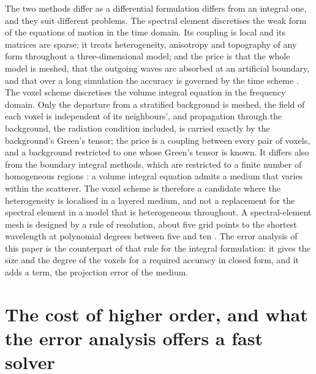 \documentclass[preprint,review,12pt]{elsarticle}
\begin{document}
The two methods differ as a differential formulation differs from an integral one, and they suit
different problems. The spectral element discretises the weak form of the equations of motion in the
time domain. Its coupling is local and its matrices are sparse; it treats heterogeneity, anisotropy
and topography of any form throughout a three-dimensional model; and the price is that the whole
model is meshed, that the outgoing waves are absorbed at an artificial boundary, and that over a long
simulation the accuracy is governed by the time scheme \citep{Komatitsch1999}. The voxel scheme
discretises the volume integral equation in the frequency domain. Only the departure from a stratified
background is meshed, the field of each voxel is independent of its neighbours', and propagation
through the background, the radiation condition included, is carried exactly by the background's
Green's tensor; the price is a coupling between every pair of voxels, and a background restricted to
one whose Green's tensor is known. It differs also from the boundary integral methods, which are
restricted to a finite number of homogeneous regions \citep{Komatitsch1999}: a volume integral
equation admits a medium that varies within the scatterer. The voxel scheme is therefore a candidate
where the heterogeneity is localised in a layered medium, and not a replacement for the spectral element
in a model that is heterogeneous throughout. A spectral-element mesh is designed by a rule of
resolution, about five grid points to the shortest wavelength at polynomial degrees between five and
ten \citep{Komatitsch1999}. The error analysis of this paper is the counterpart of that rule for the
integral formulation: it gives the size and the degree of the voxels for a required accuracy in closed
form, and it adds a term, the projection error of the medium.

\FloatBarrier

\section{The cost of higher order, and what the error analysis offers a fast solver}\label{app:cost}
\end{document}
